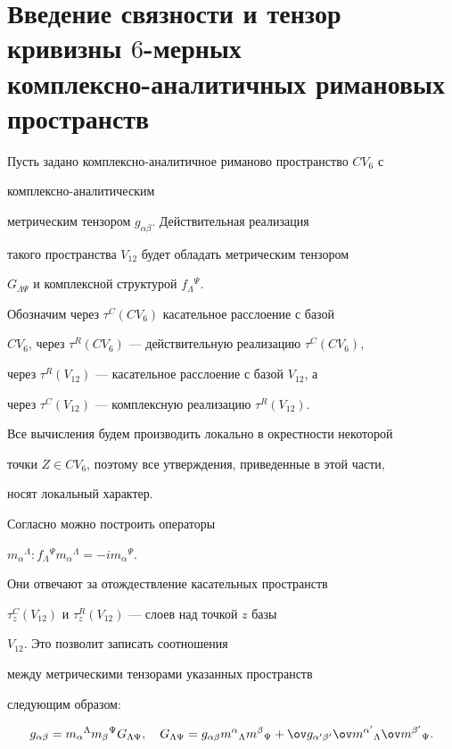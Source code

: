 \section{Введение связности и тензор кривизны $6$-мерных\protect\\


комплексно-аналитичных римановых пространств}





Пусть задано комплексно-аналитичное риманово пространство $CV_6$ с


комплексно-ана\-ли\-ти\-чес\-ким


метрическим тензором $g_{\alpha\beta}$. Действительная реализация


такого пространства $V_{12}$ будет обладать метрическим тензором


$G_{\Lambda\Psi}$ и комплексной структурой $f_\Lambda{}^\Psi$.


Обозначим через $\tau^C(CV_6)$ касательное расслоение с базой


$CV_6$, через $\tau^R(CV_6)$ --- действительную реализацию $\tau^C(CV_6)$,


через $\tau^R(V_{12})$ --- касательное расслоение с базой $V_{12}$, а


через $\tau^C(V_{12})$ --- комплексную реализацию $\tau^R(V_{12})$.


Все вычисления будем производить локально в окрестности некоторой


точки $Z\in CV_6$, поэтому все утверждения, приведенные в этой части,


носят локальный характер.


Согласно \cite{Neif1} можно построить операторы


$m_\alpha{}^\Lambda:


f_\Lambda{}^\Psi m_\alpha{}^\Lambda=-im_\alpha{}^\Psi$.


Они отвечают за отождествление касательных пространств


$\tau_z^C(V_{12})$ и $\tau_z^R(V_{12})$ --- слоев над точкой $z$ базы


$V_{12}$. Это позволит записать соотношения


между метрическими тензорами указанных пространств


следующим образом:


\begin{equation}


\label{e4s} %


g_{\alpha \beta} = m_\alpha{}^\Lambda m_\beta{}^\Psi


G_{\Lambda\Psi},\quad


G_{\Lambda\Psi}= g_{\alpha \beta} m^\alpha{}_\Lambda m^\beta{}_\Psi+


\ov g_{\alpha ' \beta '} \ov m^{\alpha '}{}_\Lambda \ov m^{\beta '}{}_\Psi.


\end{equation}


